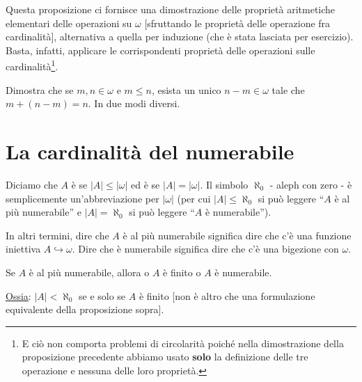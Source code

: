 \documentclass[11pt]{scrartcl}
\begin{document}
\begin{note}
	Questa proposizione ci fornisce una dimostrazione delle proprietà aritmetiche elementari delle operazioni su $\omega$ [sfruttando le proprietà delle operazione fra cardinalità], alternativa a quella per induzione (che è stata lasciata per esercizio).
	Basta, infatti, applicare le corrispondenti proprietà delle operazioni sulle cardinalità\footnote{E ciò non comporta problemi di circolarità poiché nella dimostrazione della proposizione precedente abbiamo usato \textbf{solo} la definizione delle tre operazione e nessuna delle  loro proprietà.}.
\end{note}

\begin{exercise}
	Dimostra che se $m,n \in \omega$ e $m \leq n$, esista un unico $n-m \in \omega$ tale che $m + (n-m) = n$. In due modi diversi.
\end{exercise}

\begin{soln}
	
\end{soln}


\newpage
\section{La cardinalità del numerabile}

\begin{definition}[Numerabilità]
	Diciamo che $A$ è  se $|A| \leq |\omega|$ ed è  se $|A| = |\omega|$.
	Il simbolo $\aleph_0$ - aleph con zero - è semplicemente un'abbreviazione per $|\omega|$ (per cui $|A| \leq \aleph_0$ si può leggere ``$A$ è al più numerabile'' e $|A| = \aleph_0$ si 
	può leggere ``$A$ è numerabile'').
\end{definition}

\begin{remark}
	In altri termini, dire che $A$ è al più numerabile significa dire che c'è una funzione iniettiva $A \hookrightarrow \omega$. Dire che è numerabile significa dire che c'è una bigezione con $\omega$.
\end{remark}

\begin{proposition}
	Se $A$ è al più numerabile, allora o $A$ è finito o $A$ è numerabile.
\end{proposition}

\underline{Ossia}: $|A| < \aleph_0$ se e solo se $A$ è finito [non è altro che una formulazione equivalente della proposizione sopra].
\end{document}
